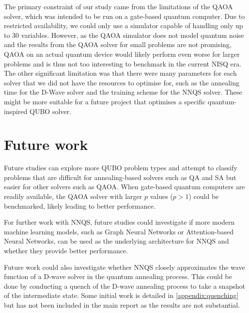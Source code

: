 The primary constraint of our study came from the limitations of the QAOA solver, which was intended to be run on a gate-based quantum computer. Due to restricted availability, we could only use a simulator capable of handling only up to $30$ variables. However, as the QAOA simulator does not model quantum noise and the results from the QAOA solver for small problems are not promising, QAOA on an actual quantum device would likely perform even worse for larger problems and is thus not too interesting to benchmark in the current NISQ era. The other significant limitation was that there were many parameters for each solver that we did not have the resources to optimise for, such as the annealing time for the D-Wave solver and the training scheme for the NNQS solver. These might be more suitable for a future project that optimises a specific quantum-inspired QUBO solver.

\section{Future work}
Future studies can explore more QUBO problem types and attempt to classify problems that are difficult for annealing-based solvers such as QA and SA but easier for other solvers such as QAOA. When gate-based quantum computers are readily available, the QAOA solver with larger $p$ values ($p > 1$) could be benchmarked, likely leading to better performance.

For further work with NNQS, future studies could investigate if more modern machine learning models, such as Graph Neural Networks or Attention-based Neural Networks, can be used as the underlying architecture for NNQS and whether they provide better performance.

Future work could also investigate whether NNQS closely approximates the wave function of a D-wave solver in the quantum annealing process. This could be done by conducting a quench of the D-wave annealing process to take a snapshot of the intermediate state. Some initial work is detailed in \autoref{appendix:quenching} but has not been included in the main report as the results are not substantial.